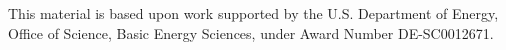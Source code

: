 This material is based upon work supported by the U.S. Department of Energy, Office of Science, Basic Energy Sciences,
under Award Number DE-SC0012671.